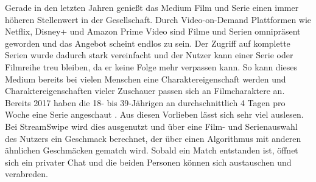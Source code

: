 Gerade in den letzten Jahren genießt das Medium Film und Serie einen immer höheren Stellenwert in der Gesellschaft. Durch Video-on-Demand Plattformen wie Netflix, Disney+ und Amazon Prime Video  sind Filme und Serien omnipräsent geworden und das Angebot scheint endlos zu sein. Der Zugriff auf komplette Serien wurde dadurch stark vereinfacht und der Nutzer kann einer Serie oder Filmreihe treu bleiben, da er keine Folge mehr verpassen kann. So kann dieses Medium bereits bei vielen Menschen eine Charaktereigenschaft werden und Charaktereigenschaften vieler Zuschauer passen sich an Filmcharaktere an.\\
Bereits 2017 haben die 18- bis 39-Jährigen an durchschnittlich 4 Tagen pro Woche eine Serie angeschaut \cite{serienkonsum}. Aus diesen Vorlieben lässt sich sehr viel auslesen. Bei StreamSwipe wird dies ausgenutzt und über eine Film- und Serienauswahl des Nutzers ein Geschmack berechnet, der über einen Algorithmus mit anderen ähnlichen Geschmäcken gematch wird. Sobald ein Match entstanden ist, öffnet sich ein privater Chat und die beiden Personen können sich austauschen und verabreden.